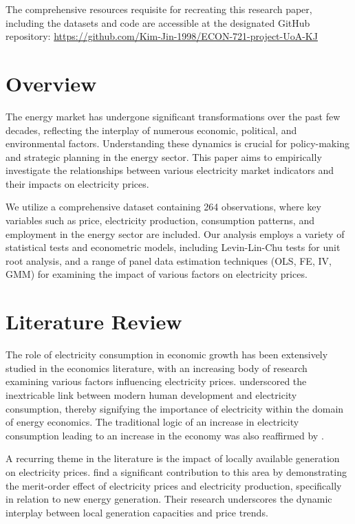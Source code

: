 \documentclass[12pt]{article}
\begin{document}
The comprehensive resources requisite for recreating this research paper, including the datasets and code are accessible at the designated GitHub repository: \url{https://github.com/Kim-Jin-1998/ECON-721-project-UoA-KJ}

\newpage
\tableofcontents

\newpage
{}

\section{Overview}
The energy market has undergone significant transformations over the past few decades, reflecting the interplay of numerous economic, political, and environmental factors. Understanding these dynamics is crucial for policy-making and strategic planning in the energy sector. This paper aims to empirically investigate the relationships between various electricity market indicators and their impacts on electricity prices.

We utilize a comprehensive dataset containing 264 observations, where key variables such as price, electricity production, consumption patterns, and employment in the energy sector are included. Our analysis employs a variety of statistical tests and econometric models, including Levin-Lin-Chu tests for unit root analysis, and a range of panel data estimation techniques (OLS, FE, IV, GMM) for examining the impact of various factors on electricity prices.

\section{Literature Review}
The role of electricity consumption in economic growth has been extensively studied in the economics literature, with an increasing body of research examining various factors influencing electricity prices. \cite{stern2012role} underscored the inextricable link between modern human development and electricity consumption, thereby signifying the importance of electricity within the domain of energy economics. The traditional logic of an increase in electricity consumption leading to an increase in the economy was also reaffirmed by \cite{karanfil2015electricity}.

A recurring theme in the literature is the impact of locally available generation on electricity prices. \cite{de2018renewable} find a significant contribution to this area by demonstrating the merit-order effect of electricity prices and electricity production, specifically in relation to new energy generation. Their research underscores the dynamic interplay between local generation capacities and price trends.
\end{document}
